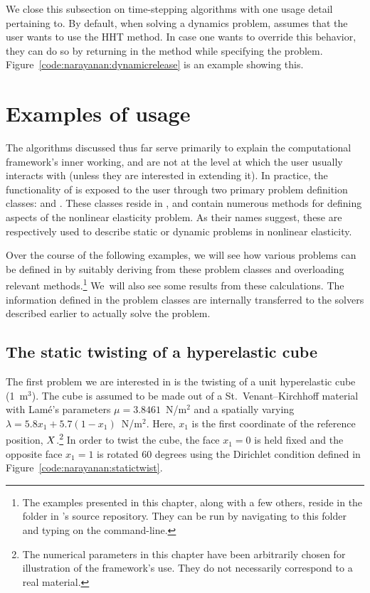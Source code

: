 We close this subsection on time-stepping algorithms with one usage
detail pertaining to\break \twist. By default, when solving a dynamics
problem, \twist{} assumes that the user wants to use the HHT
method. In case one wants to override this behavior, they can do so by
returning  in the  method while
specifying the problem. Figure~\ref{code:narayanan:dynamicrelease} is
an example showing this.

\section{Examples of \twist{} usage}

The algorithms discussed thus far serve primarily to explain the
computational framework's \hbox{inner} working, and are not at the level at
which the user usually interacts with \twist{} (unless they are
interested in extending it). In practice, the functionality of
\twist{} is exposed to the user through two primary problem definition
classes:  and . These
classes reside in , and contain numerous
methods for defining aspects of the nonlinear elasticity problem. As
their names suggest, these are respectively used to describe static or
dynamic problems in nonlinear elasticity.

Over the course of the following examples, we will see how various
problems can be defined in \twist{} by suitably deriving from these
problem classes and overloading relevant methods.\footnote{The
examples presented in this chapter, along with a few others, reside in
the  folder in \twist's source repository. They can
be run by navigating to this folder and typing  on the command-line.} We~will also see some results
from these calculations. The information defined in the problem
classes are internally transferred to the solvers described earlier to
actually solve the problem.

\subsection{The static twisting of a hyperelastic cube}

The first problem we are interested in is the twisting of a unit
hyperelastic cube (1~m$^3$). The cube is assumed to be made out of a
St.~Venant--Kirchhoff material with Lam\'e's parameters $\mu =
3.8461$~N/m$^2$ and a spatially varying $\lambda = 5.8 x_{1} + 5.7 (1
- x_{1})$~N/m$^2$. Here, $x_{1}$ is the first coordinate of the
reference position, $\mbox{$ X$}$.\footnote{The numerical parameters in this
  chapter have been arbitrarily chosen for illustration of the
  framework's use. They do not necessarily correspond to a real
  material.} In order to twist the cube, the face $x_{1} = 0$ is held
fixed and the opposite face $x_{1} = 1$ is rotated 60 degrees using
the Dirichlet condition defined in
Figure~\ref{code:narayanan:statictwist}.


